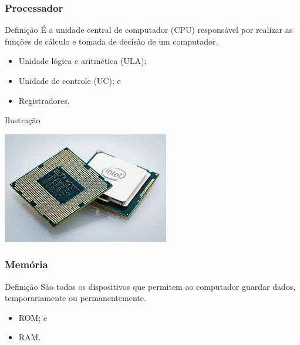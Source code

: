 \documentclass[aspectratio=169]{beamer} %
\begin{document}
\begin{frame}
	\frametitle{Processador}
	
	\begin{block}{Defini\c cão}
		É a unidade central de computador (CPU) responsável por realizar as funções de cálculo e tomada de decisão de um computador.
	\end{block}\vfill
	
	\begin{itemize}
		\item Unidade lógica e aritmética (ULA);
		\item Unidade de controle (UC); e
		\item Registradores.
	\end{itemize}\vfill
	
	\begin{exampleblock}{Ilustra\c cão}
		\begin{center}
			\includegraphics[scale=0.4]{img/processador}
		\end{center}
	\end{exampleblock}
\end{frame}

\begin{frame}
	\frametitle{Memória}
	
	\begin{block}{Defini\c cão}
		São todos os dispositivos que permitem ao computador guardar dados, temporariamente ou permanentemente.
	\end{block}\vfill
	
	\begin{itemize}
		\item ROM; e
		\item RAM.
	\end{itemize}
\end{frame}
\end{document}
